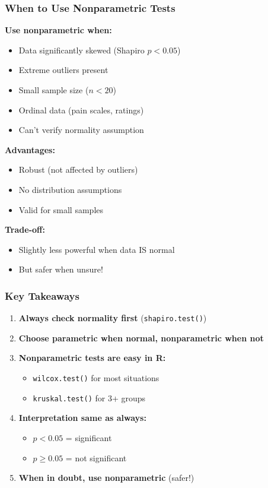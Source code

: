 \documentclass{beamer}
\begin{document}
\begin{frame}
\frametitle{When to Use Nonparametric Tests}

\textbf{Use nonparametric when:}
\begin{itemize}
\item Data significantly skewed (Shapiro $p < 0.05$)
\item Extreme outliers present
\item Small sample size ($n < 20$)
\item Ordinal data (pain scales, ratings)
\item Can't verify normality assumption
\end{itemize}

\vspace{0.5cm}
\textbf{Advantages:}
\begin{itemize}
\item Robust (not affected by outliers)
\item No distribution assumptions
\item Valid for small samples
\end{itemize}

\vspace{0.5cm}
\textbf{Trade-off:}
\begin{itemize}
\item Slightly less powerful when data IS normal
\item But safer when unsure!
\end{itemize}
\end{frame}

\begin{frame}
\frametitle{Key Takeaways}

\begin{enumerate}
\item \textbf{Always check normality first} (\texttt{shapiro.test()})

\vspace{0.3cm}
\item \textbf{Choose parametric when normal, nonparametric when not}

\vspace{0.3cm}
\item \textbf{Nonparametric tests are easy in R:}
   \begin{itemize}
   \item \texttt{wilcox.test()} for most situations
   \item \texttt{kruskal.test()} for 3+ groups
   \end{itemize}

\vspace{0.3cm}
\item \textbf{Interpretation same as always:}
   \begin{itemize}
   \item $p < 0.05$ = significant
   \item $p \geq 0.05$ = not significant
   \end{itemize}

\vspace{0.3cm}
\item \textbf{When in doubt, use nonparametric} (safer!)
\end{enumerate}
\end{frame}
\end{document}

